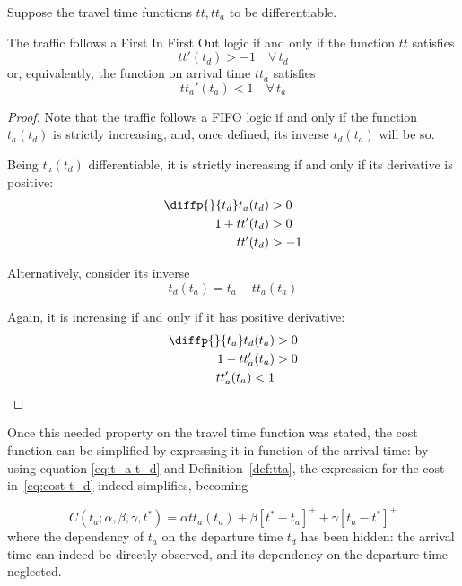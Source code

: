 \begin{lemma}
  \label{lemma:bounded-der-tt}
  Suppose the travel time functions \(tt, tt_a\) to be differentiable.
  
  The traffic follows a First In First Out logic if and only if the function \(tt\) satisfies
  \begin{equation*}
    tt'(t_d) > -1\quad \forall \, t_d
  \end{equation*}
  or, equivalently, the function on arrival time \(tt_a\) satisfies
  \begin{equation*}
    tt_a'(t_a) < 1\quad \forall \, t_a
  \end{equation*}
\end{lemma}
\begin{proof}
  Note that the traffic follows a FIFO logic if and only if the function \(t_a(t_d)\) is strictly increasing,
  and, once defined, its inverse \(t_d(t_a)\) will be so.
  
  Being \(t_a(t_d)\) differentiable, it is strictly increasing if and only if its derivative is positive:
  \begin{align*}
    \diffp{}{{t_d}} t_a(t_d) & > 0 \\
    1 + tt'(t_d) & > 0 \\
    tt'(t_d) & > -1
  \end{align*}
  
  Alternatively, consider its inverse
  \begin{equation*}
    t_d(t_a) = t_a - tt_a(t_a)
  \end{equation*}

  Again, it is increasing if and only if it has positive derivative:
  \begin{align*}
    \diffp{}{{t_a}} t_d(t_a) & > 0 \\
    1 - tt_a'(t_a) & > 0 \\
    tt_a'(t_a) < 1
  \end{align*}
\end{proof}

Once this needed property on the travel time function was stated,
the cost function can be simplified by expressing it in function of the arrival time:
by using equation \eqref{eq:t_a-t_d} and Definition~\ref{def:tta},
the expression for the cost in~\eqref{eq:cost-t_d} indeed simplifies,
becoming

\begin{equation}
  \label{eq:cost-t_a}
  C(t_a; \alpha, \beta, \gamma, t^*) = \alpha tt_a(t_a) + \beta[t^*- t_a]^+ + \gamma[t_a - t^*]^+ 
\end{equation}
where the dependency of \(t_a\) on the departure time \(t_d\) has been hidden:
the arrival time can indeed be directly observed,
and its dependency on the departure time neglected.


